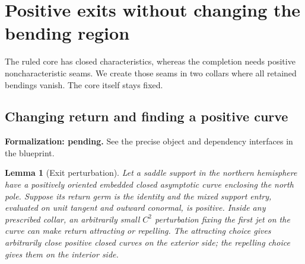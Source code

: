 \documentclass[11pt]{amsart}
\newtheorem{lemma}[theorem]{Lemma}
\theoremstyle{definition}
\theoremstyle{remark}
\numberwithin{equation}{section}
\begin{document}
\section{Positive exits without changing the bending region}\label{sec:exits}
The ruled core has closed characteristics, whereas the completion needs
positive noncharacteristic seams. We create those seams in two collars
where all retained bendings vanish. The core itself stays fixed.

\subsection{Changing return and finding a positive curve}
\par\noindent\textbf{Formalization: pending.} See the precise object and dependency interfaces in the blueprint.\par
\begin{lemma}[Exit perturbation]\label{lem:exit}
Let a saddle support in the northern hemisphere have a positively oriented
embedded closed asymptotic curve enclosing the north pole. Suppose its
return germ is the identity and the mixed support entry, evaluated on
unit tangent and outward conormal, is positive. Inside any prescribed
collar, an arbitrarily small $C^2$ perturbation fixing the first jet on
the curve can make return attracting or repelling. The attracting choice
gives arbitrarily close positive closed curves on the exterior side;
the repelling choice gives them on the interior side.
\end{lemma}
\end{document}
